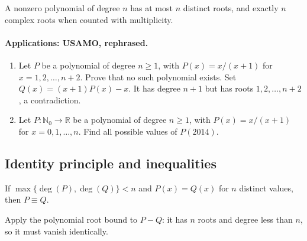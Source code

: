 \documentclass[11pt,a4paper]{article}
\begin{document}
\setcounter{theorem}{67}\begin{lemma}
A nonzero polynomial of degree $n$ has at most $n$ distinct roots, and exactly
$n$ complex roots when counted with multiplicity.
\end{lemma}
\paragraph{Applications: USAMO, rephrased.}
\begin{enumerate}
\setcounter{enumi}{0}\item Let $P$ be a polynomial of degree $n\geq1$, with $P(x)=x/(x+1)$ for $x=1,2,\ldots,n+2$.
Prove that no such polynomial exists.
Set $Q(x)=(x+1)P(x)-x$. It has degree $n+1$ but has roots $1,2,\ldots,n+2$, a contradiction.
\setcounter{enumi}{1}\item Let $P:\mathbb N_0\to\mathbb R$ be a polynomial of degree $n\geq1$,
with $P(x)=x/(x+1)$ for $x=0,1,\ldots,n$. Find all possible values of $P(2014)$.
\end{enumerate}

\subsection{Identity principle and inequalities}
\setcounter{theorem}{68}\begin{lemma}\label{lemma:lb1-72}
If $\max\{\deg(P),\deg(Q)\}<n$ and $P(x)=Q(x)$ for $n$ distinct values, then $P\equiv Q$.
\end{lemma}
Apply the polynomial root bound to $P-Q$: it has $n$ roots and degree less
than $n$, so it must vanish identically.
\end{document}
